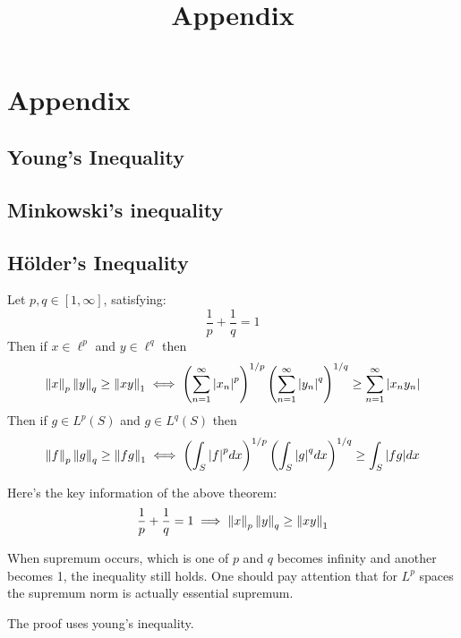 \documentclass{article}
\title{Appendix}
\begin{document}
\maketitle

\section{Appendix}

\subsection{Young's Inequality}\label{Young's Inequality}
\placeholder

\subsection{Minkowski's inequality}\label{Minkowski-holder}
\placeholder


\subsection{Hölder's Inequality}\label{Hölder's inequality}
\begin{theorem}\rm\nextline
Let $p,q\in[1,\infty]$,	satisfying:
$$
\frac{1}{p}+\frac{1}{q}=1
$$
Then if $x\in\ell^p$ and $y\in\ell^q$ then 
$$
\left\|{x}\right\|_p\left\|{y}\right\|_q\geq\left\|{xy}\right\|_1
\iff
\left(\sum_{n=1}^\infty{|x_n|}^p\right)^{1/p}
\left(\sum_{n=1}^\infty{|y_n|}^q\right)^{1/q}\geq\sum_{n=1}^\infty|x_ny_n|
$$
Then if $g\in L^p(S)$ and $g\in L^q(S)$ then 
$$
\left\|{f}\right\|_p\left\|{g}\right\|_q\geq\left\|{fg}\right\|_1
\iff
\left(\int_S{|f|}^pdx\right)^{1/p}
\left(\int_S{|g|}^qdx\right)^{1/q}
\geq\int_S|fg|dx
$$
\end{theorem}
\begin{remark}\rm\nextline
Here's the key information of the above theorem:
$$
\frac{1}{p}+\frac{1}{q}=1\implies \left\|{x}\right\|_p\left\|{y}\right\|_q\geq\left\|{xy}\right\|_1
$$
\end{remark}
\begin{remark}
When supremum occurs, which is  one of $p$ and $q$ becomes infinity and another becomes 1, the inequality still holds. One should pay attention that for $L^p$ spaces the supremum norm is actually essential supremum.
\end{remark}

\begin{remark}\rm\nextline
The proof uses young's inequality.\\
\placeholder
\end{remark}
\end{document}
